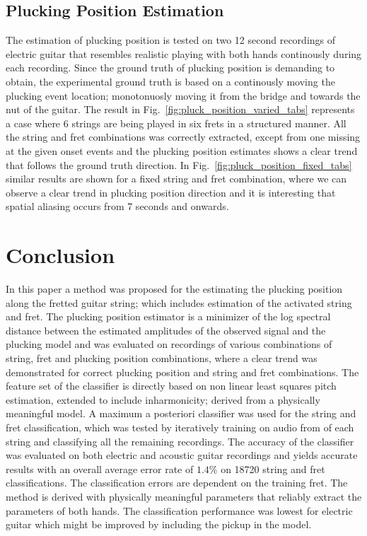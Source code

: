 \documentclass{article}
\begin{document}
\subsection{Plucking Position Estimation} %
\label{sec:string_estimation}
The estimation of plucking position is tested on two 12 second recordings of electric guitar that resembles realistic playing with both hands continously during each recording. Since the ground truth of plucking position is demanding to obtain, the experimental ground truth is based on a continously moving the plucking event location; monotonuosly moving it from the bridge and towards the nut of the guitar. The result in Fig.~\ref{fig:pluck_position_varied_tabs} represents a case where 6 strings are being played in six frets in a structured manner. All the string and fret combinations was correctly extracted, except from one missing at the given onset events and the plucking position estimates shows a clear trend that follows the ground truth direction. In Fig.~\ref{fig:pluck_position_fixed_tabs} similar results are shown for a fixed string and fret combination, where we can observe a clear trend in plucking position direction and it is interesting that spatial aliasing occurs from 7 seconds and onwards. \vspace{-.6mm}
%
%
%
%
%
%
\section{Conclusion} 
\label{sec:conclusion}
\vspace{-.6mm}
In this paper a method was proposed for the estimating the plucking position along the fretted guitar string; which includes estimation of the activated string and fret. The plucking position estimator is a minimizer of the log spectral distance between the estimated amplitudes of the observed signal and the plucking model and was evaluated on recordings of various combinations of string, fret and plucking position combinations, where a clear trend was demonstrated for correct plucking position and string and fret combinations. The feature set of the classifier is directly based on non linear least squares pitch estimation, extended to include inharmonicity; derived from a physically meaningful model. A maximum a posteriori classifier was used for the string and fret classification, which was tested by iteratively training on audio from of each string and classifying all the remaining recordings. The accuracy of the classifier was evaluated on both electric and acoustic guitar recordings and yields accurate results with an overall average error rate of $1.4\%$ on 18720 string and fret classifications. The classification errors are dependent on the training fret. The method is derived with physically meaningful parameters that reliably extract the parameters of both hands. The classification performance was lowest for electric guitar which might be improved by including the pickup in the model. 
%
%
%
%
%
\vfill\pagebreak

%

\end{document}
